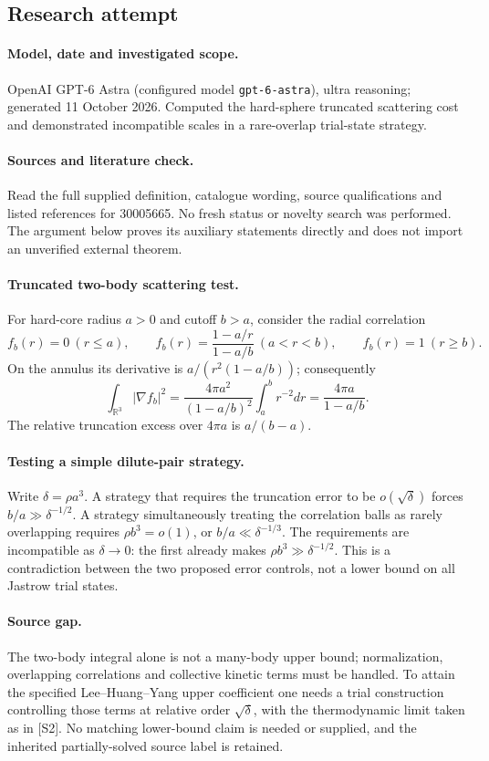 \documentclass[11pt]{article}
\begin{document}
\subsection{Research attempt}
\paragraph{Model, date and investigated scope.}
OpenAI GPT-6 Astra (configured model \texttt{gpt-6-astra}), ultra reasoning; generated 11 October 2026. Computed the hard-sphere truncated scattering cost and demonstrated incompatible scales in a rare-overlap trial-state strategy.

\paragraph{Sources and literature check.}
Read the full supplied definition, catalogue wording, source qualifications and listed references for 30005665. No fresh status or novelty search was performed. The argument below proves its auxiliary statements directly and does not import an unverified external theorem.

\paragraph{Truncated two-body scattering test.} For hard-core radius \(a>0\) and cutoff \(b>a\), consider the radial correlation
\[
 f_b(r)=0\ (r\leq a),\qquad
 f_b(r)=\frac{1-a/r}{1-a/b}\ (a<r<b),\qquad f_b(r)=1\ (r\geq b).
\]
On the annulus its derivative is \(a/(r^2(1-a/b))\); consequently
\[
 \int_{\mathbb R^3}|\nabla f_b|^2
 =\frac{4\pi a^2}{(1-a/b)^2}\int_a^b r^{-2}dr
 =\frac{4\pi a}{1-a/b}.
\]
The relative truncation excess over \(4\pi a\) is \(a/(b-a)\).
\paragraph{Testing a simple dilute-pair strategy.} Write \(\delta=\rho a^3\). A strategy that requires the truncation error to be \(o(\sqrt\delta)\) forces \(b/a\gg\delta^{-1/2}\). A strategy simultaneously treating the correlation balls as rarely overlapping requires \(\rho b^3=o(1)\), or \(b/a\ll\delta^{-1/3}\). The requirements are incompatible as \(\delta\to0\): the first already makes \(\rho b^3\gg\delta^{-1/2}\). This is a contradiction between the two proposed error controls, not a lower bound on all Jastrow trial states.
\paragraph{Source gap.} The two-body integral alone is not a many-body upper bound; normalization, overlapping correlations and collective kinetic terms must be handled. To attain the specified Lee--Huang--Yang upper coefficient one needs a trial construction controlling those terms at relative order \(\sqrt\delta\), with the thermodynamic limit taken as in [S2]. No matching lower-bound claim is needed or supplied, and the inherited partially-solved source label is retained.
\end{document}
